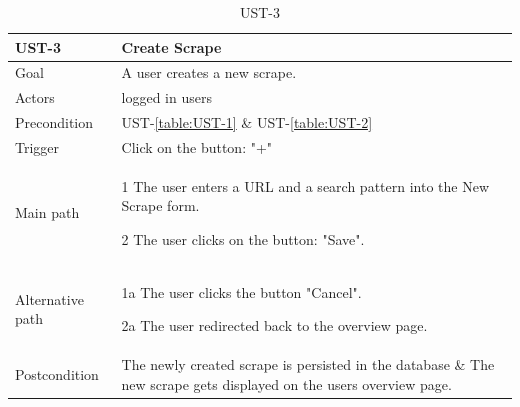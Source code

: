 \documentclass[titlepage, 12pt]{article}
\newenvironment{packed_itemize}{
  \vspace{-\topsep}
  \begin{itemize}
    \setlength{\itemsep}{1pt}
    \setlength{\parskip}{0pt}
    \setlength{\parsep}{0pt}
  }{\end{itemize}}
\begin{document}
\begin{table}[H]
  \begin{center}

    \begin{tabular}{p{4cm}|p{10cm}}
      \textbf{UST-3}   & \textbf{Create Scrape}                                                                                             \\
      \hline
      Goal             & A user creates a new scrape.                                                                                       \\
      \hline
      Actors           & logged in users                                                                                                    \\
      \hline
      Precondition     & UST-\ref{table:UST-1} \& UST-\ref{table:UST-2}                                                                     \\
      \hline
      Trigger          & Click on the button: "+"                                                                                           \\
      \hline
      Main path        &
      \begin{packed_itemize}
        \item [1] The user enters a URL and a search pattern into the New Scrape form.
        \item [2] The user clicks on the button: "Save".
      \end{packed_itemize}                                                                                                             \\
      \hline
      Alternative path &
      \begin{packed_itemize}
        \item [1a] The user clicks the button "Cancel".
        \item [2a] The user redirected back to the overview page.
      \end{packed_itemize}                                                                                                             \\
      \hline
      Postcondition    & The newly created scrape is persisted in the database \& The new scrape gets displayed on the users overview page. \\
    \end{tabular}

    \caption{UST-3}
    \label{table:UST-3}

  \end{center}
\end{table}
\end{document}
